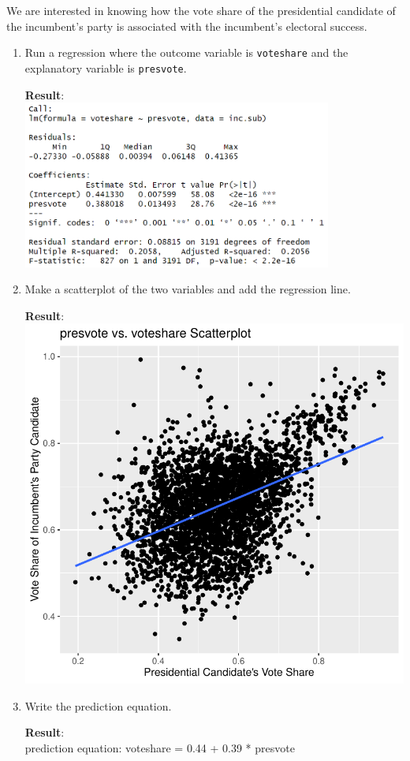 \documentclass[12pt,letterpaper]{article}
\begin{document}
\noindent We are interested in knowing how the vote share of the presidential candidate of the incumbent's party is associated with the incumbent's electoral success.
	\vspace{.25cm}
	\begin{enumerate}
		\item Run a regression where the outcome variable is \texttt{voteshare} and the explanatory variable is \texttt{presvote}.
			\vspace{.25cm}
			 
			\textbf{Result}:\\
			\includegraphics[width=0.8\textwidth]{plot_3a.png}
			\vspace{.25cm}
		\item Make a scatterplot of the two variables and add the regression line. 
			\vspace{.25cm}
			 
			\textbf{Result}:\\
			\includegraphics[width=.85\textwidth]{plot_3b.pdf} 
			\vspace{.25cm}
		\item Write the prediction equation.
			\vspace{.25cm}
			 
			\textbf{Result}:\\
			prediction equation: voteshare = 0.44 + 0.39 * presvote
	\end{enumerate}
	
\end{document}

